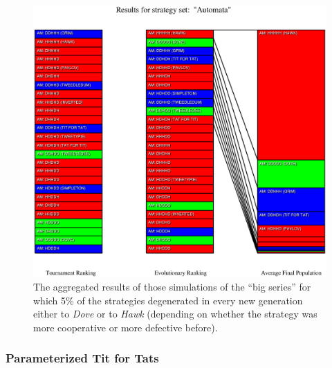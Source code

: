 \begin{figure}
\begin{center}
\includegraphics[width=20cm]{tables/Automata_D0.050.eps}
\caption{\label{Automata_D0050} The aggregated results of those
simulations of the ``big series'' for which 5\% of the strategies degenerated
in every new generation either to {\em Dove} or to {\em Hawk} (depending on
whether the strategy was more cooperative or more defective before).}
\end{center}
\end{figure}

\newpage
\subsubsection{Parameterized Tit for Tats}


